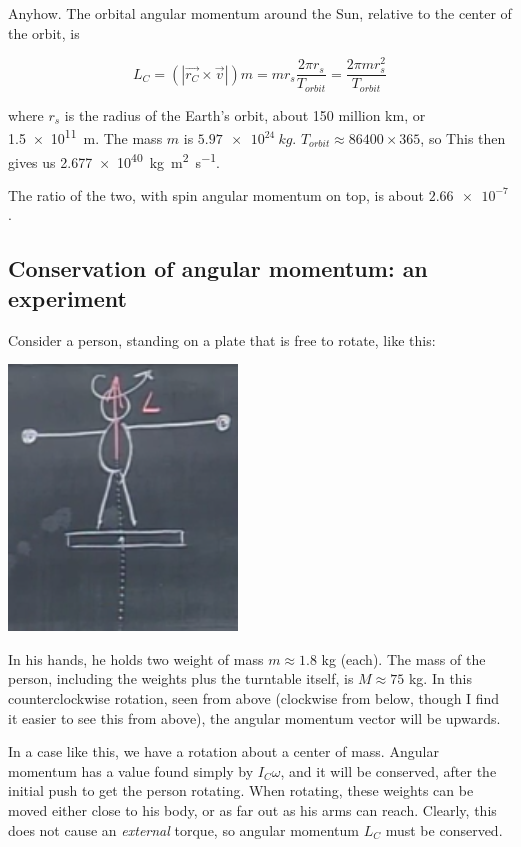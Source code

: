 \documentclass[8.01x]{subfiles}
\begin{document}
Anyhow.
The orbital angular momentum around the Sun, relative to the center of the orbit, is

\begin{equation}
L_C = (|\vec{r_C} \times \vec{v}|) m = m r_s \frac{2 \pi r_s}{T_{orbit}} = \frac{2 \pi m r_s^2}{T_{orbit}}
\end{equation}

where $r_s$ is the radius of the Earth's orbit, about 150 million km, or \SI{1.5e11}{m}. The mass $m$ is $\SI{5.97e24}{kg}$. $T_{orbit} \approx 86400 \times 365$, so
This then gives us \SI{2.677e40}{kg m^2 s^{-1}}.

The ratio of the two, with spin angular momentum on top, is about $\num{2.66e-7}$.

\subsection{Conservation of angular momentum: an experiment}

Consider a person, standing on a plate that is free to rotate, like this:

\begin{center}
\includegraphics[scale=0.7]{Graphics/lec20_cons_angular_momentum}
\end{center}

In his hands, he holds two weight of mass $m \approx 1.8$ kg (each). The mass of the person, including the weights plus the turntable itself, is $M \approx 75$ kg.
In this counterclockwise rotation, seen from above (clockwise from below, though I find it easier to see this from above), the angular momentum vector will be upwards.

In a case like this, we have a rotation about a center of mass. Angular momentum has a value found simply by $I_C \omega$, and it will be conserved, after the initial push to get the person rotating. When rotating, these weights can be moved either close to his body, or as far out as his arms can reach. Clearly, this does not cause an \emph{external} torque, so angular momentum $L_C$ must be conserved.
\end{document}
